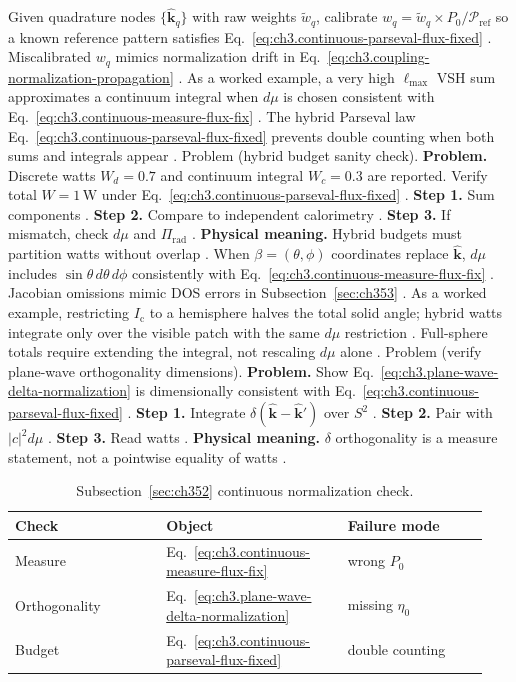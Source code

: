 Given quadrature nodes \(\{\hat{\mathbf{k}}_{q}\}\) with raw weights \(\tilde{w}_{q}\), calibrate
\(w_{q}=\tilde{w}_{q}\times P_{0}/\mathcal{P}_{\mathrm{ref}}\) so a known reference pattern satisfies
Eq.~\eqref{eq:ch3.continuous-parseval-flux-fixed} \cite{harrington2001}. Miscalibrated \(w_{q}\) mimics
normalization drift in Eq.~\eqref{eq:ch3.coupling-normalization-propagation} \cite{harrington2001}.
As a worked example, a very high \(\ell_{\max}\) VSH sum approximates a continuum integral when \(d\mu\) is chosen consistent with
Eq.~\eqref{eq:ch3.continuous-measure-flux-fix} \cite{hansen1988}. The hybrid Parseval law
Eq.~\eqref{eq:ch3.continuous-parseval-flux-fixed} prevents double counting when both sums and integrals appear
\cite{harrington2001}.
Problem (hybrid budget sanity check). \textbf{Problem.} Discrete watts \(W_{d}=0.7\) and continuum integral \(W_{c}=0.3\) are reported. Verify total
\(W=1\,\mathrm{W}\) under Eq.~\eqref{eq:ch3.continuous-parseval-flux-fixed} \cite{stratton1941}.
\textbf{Step 1.} Sum components \cite{poynting1884}.
\textbf{Step 2.} Compare to independent calorimetry \cite{harrington2001}.
\textbf{Step 3.} If mismatch, check \(d\mu\) and \(\Pi_{\mathrm{rad}}\) \cite{stratton1941}.
\textbf{Physical meaning.} Hybrid budgets must partition watts without overlap \cite{hansen1988}.
When \(\beta=(\theta,\phi)\) coordinates replace \(\hat{\mathbf{k}}\), \(d\mu\) includes \(\sin\theta\,d\theta\,d\phi\) consistently with
Eq.~\eqref{eq:ch3.continuous-measure-flux-fix} \cite{jackson1999}. Jacobian omissions mimic DOS errors in
Subsection~\ref{sec:ch353} \cite{harrington2001}.
As a worked example, restricting \(I_{\mathrm{c}}\) to a hemisphere halves the total solid angle; hybrid watts integrate only over the visible
patch with the same \(d\mu\) restriction \cite{jackson1999}. Full-sphere totals require
extending the integral, not rescaling \(d\mu\) alone \cite{hansen1988}.
Problem (verify plane-wave orthogonality dimensions). \textbf{Problem.} Show Eq.~\eqref{eq:ch3.plane-wave-delta-normalization} is dimensionally consistent with
Eq.~\eqref{eq:ch3.continuous-parseval-flux-fixed} \cite{jackson1999}.
\textbf{Step 1.} Integrate \(\delta(\hat{\mathbf{k}}-\hat{\mathbf{k}}')\) over \(S^{2}\) \cite{jackson1999}.
\textbf{Step 2.} Pair with \(|c|^{2}d\mu\) \cite{hansen1988}.
\textbf{Step 3.} Read watts \cite{poynting1884}.
\textbf{Physical meaning.} \(\delta\) orthogonality is a measure statement, not a pointwise equality of watts
\cite{harrington2001}.
\begin{table}[t]
\centering
\caption{Subsection~\ref{sec:ch352} continuous normalization check.}
\label{tab:ch3.352-measure-audit}
\small
\begin{tabular}{@{}p{0.30\linewidth}p{0.36\linewidth}p{0.28\linewidth}@{}}
\toprule
Check & Object & Failure mode \\
\midrule
Measure & Eq.~\eqref{eq:ch3.continuous-measure-flux-fix} & wrong \(P_{0}\) \\
Orthogonality & Eq.~\eqref{eq:ch3.plane-wave-delta-normalization} & missing \(\eta_0\) \\
Budget & Eq.~\eqref{eq:ch3.continuous-parseval-flux-fixed} & double counting \\
\bottomrule
\end{tabular}
\end{table}

